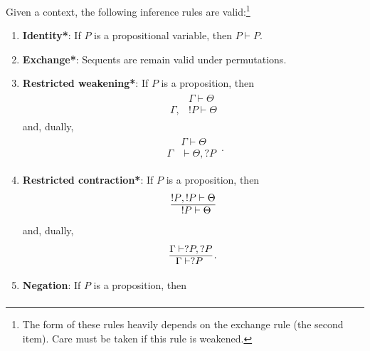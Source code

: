     Given a context, the following inference rules are valid:\footnote{The form of these rules heavily depends on the exchange rule (the second item). Care must be taken if this rule is weakened.}
    \begin{enumerate}
        \item\textbf{Identity*}: If $P$ is a propositional variable, then $P\vdash P$.
        \item\textbf{Exchange*}: Sequents are remain valid under permutations.
        \item\textbf{Restricted weakening*}: If $P$ is a proposition, then
            \begin{gather}
                \begin{aligned}
                    &\Gamma\vdash\Theta\\
                    \hline
                    \Gamma,&!P\vdash\Theta
                \end{aligned}
            \end{gather}
            and, dually,
            \begin{gather}
                \begin{aligned}
                    &\Gamma\vdash\Theta\\
                    \hline
                    \Gamma&\vdash\Theta,?P
                \end{aligned}\,.
            \end{gather}
        \item\textbf{Restricted contraction*}: If $P$ is a proposition, then
            \begin{gather}
                \begin{aligned}
                    !P&,!P\vdash\Theta\\
                    \hline
                    &!P\vdash\Theta
                \end{aligned}
            \end{gather}
            and, dually,
            \begin{gather}
                \begin{aligned}
                    \Gamma&\vdash?P,?P\\
                    \hline
                    &\Gamma\vdash?P
                \end{aligned}\,.
            \end{gather}
        \item\textbf{Negation}: If $P$ is a proposition, then
            \begin{gather}

\end{gather}
\end{enumerate}
